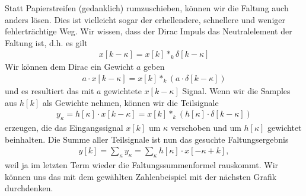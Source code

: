 \noindent Statt Papierstreifen (gedanklich) rumzuschieben, können wir die Faltung
auch anders lösen.
%
Dies ist vielleicht sogar der erhellendere, schnellere und weniger fehlerträchtige Weg.
%
Wir wissen, dass der Dirac Impuls das Neutralelement der Faltung ist, d.h. es gilt
\begin{align}
x[k - \kappa] = x[k] \ast_k \delta[k-\kappa]
\end{align}
Wir können dem Dirac ein Gewicht $a$ geben
\begin{align}
a \cdot x[k - \kappa] = x[k] \ast_k (a \cdot \delta[k-\kappa])
\end{align}
und es resultiert das mit $a$ gewichtete $x[k - \kappa]$ Signal.
%
Wenn wir die Samples aus $h[k]$ als Gewichte nehmen, können wir die Teilsignale
\begin{align}
y_\kappa = h[\kappa] \cdot x[k - \kappa] = x[k] \ast_k (h[\kappa] \cdot \delta[k-\kappa])
\end{align}
erzeugen, die das Eingangssignal $x[k]$ um $\kappa$ verschoben und um $h[\kappa]$ gewichtet beinhalten.
%
Die Summe aller Teilsignale ist nun das gesuchte Faltungsergebnis
\begin{align}
\label{eq:LinKombDiskFaltung}
y[k] = \sum\limits_{\kappa} y_\kappa = \sum\limits_{\kappa} h[\kappa] \cdot x[-\kappa + k],
\end{align}
weil ja im letzten Term wieder die Faltungssummenformel rauskommt.
%
Wir können uns das mit dem gewählten Zahlenbeispiel mit der nächsten Grafik durchdenken.

\newpage
\begin{center}
\end{center}


